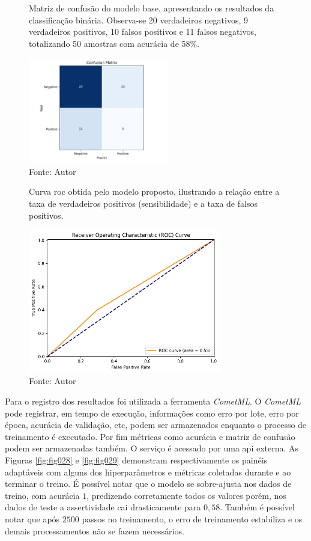 \begin{figure}[h!]
    \centering
    \captionsetup{width=0.98\textwidth, justification=justified}
    \caption{Matriz de confusão do modelo base, apresentando os resultados da classificação binária. Observa-se 20 verdadeiros negativos, 9 verdadeiros positivos, 10 falsos positivos e 11 falsos negativos, totalizando 50 amostras com acurácia de 58\%.
    }
    \includegraphics[width=0.55\textwidth]{figures/fig016.png}
    \caption*{Fonte: Autor}
    \label{fig:fig016}
\end{figure}

\begin{figure}[h!]
    \centering
    \captionsetup{width=0.98\textwidth, justification=justified}
    \caption{Curva \gls{roc} obtida pelo modelo proposto, ilustrando a relação entre a taxa de verdadeiros positivos (sensibilidade) e a taxa de falsos positivos.
    }
    \includegraphics[width=0.75\textwidth]{figures/fig017.png}
    \caption*{Fonte: Autor}
    \label{fig:fig017}
\end{figure}


Para o registro dos resultados foi utilizada a ferramenta \textit{CometML}. O \textit{CometML} pode registrar, em tempo de execução, informações como erro por lote, erro por época, acurácia de validação, etc, podem ser armazenados enquanto o processo de treinamento é executado. Por fim métricas como acurácia e matriz de confusão podem ser armazenadas também. O serviço é acessado  por uma \gls{api} externa. As Figuras \ref{fig:fig028} e \ref{fig:fig029} demonstram respectivamente os painéis adaptáveis com alguns dos hiperparâmetros e métricas coletadas durante e ao terminar o treino. É possível notar que o modelo se sobre-ajusta nos dados de treino, com acurácia $1$, predizendo corretamente todos os valores porém, nos dados de teste a assertividade cai drasticamente para $0,58$. Também é possível notar que após $2500$ passos no treinamento, o erro de treinamento estabiliza e os demais processamentos não se fazem necessários.

